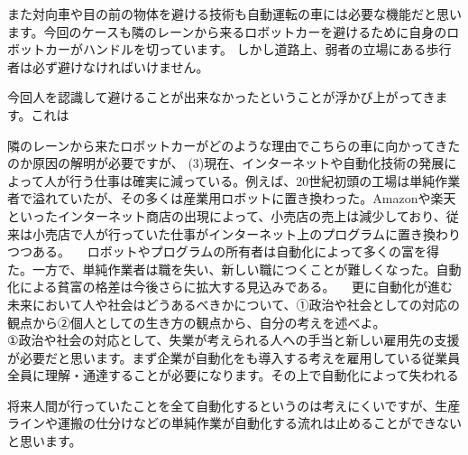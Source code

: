 \documentclass[11pt,a4paper]{jsarticle}
\begin{document}
また対向車や目の前の物体を避ける技術も自動運転の車には必要な機能だと思います。今回のケースも隣のレーンから来るロボットカーを避けるために自身のロボットカーがハンドルを切っています。
しかし道路上、弱者の立場にある歩行者は必ず避けなければいけません。

今回人を認識して避けることが出来なかったということが浮かび上がってきます。これは


隣のレーンから来たロボットカーがどのような理由でこちらの車に向かってきたのか原因の解明が必要ですが、
\newpage
 (3)現在、インターネットや自動化技術の発展によって人が行う仕事は確実に減っている。例えば、20世紀初頭の工場は単純作業者で溢れていたが、その多くは産業用ロボットに置き換わった。Amazonや楽天といったインターネット商店の出現によって、小売店の売上は減少しており、従来は小売店で人が行っていた仕事がインターネット上のプログラムに置き換わりつつある。
　ロボットやプログラムの所有者は自動化によって多くの富を得た。一方で、単純作業者は職を失い、新しい職につくことが難しくなった。自動化による貧富の格差は今後さらに拡大する見込みである。
　更に自動化が進む未来において人や社会はどうあるべきかについて、①政治や社会としての対応の観点から②個人としての生き方の観点から、自分の考えを述べよ。\\
 
①政治や社会の対応として、失業が考えられる人への手当と新しい雇用先の支援が必要だと思います。まず企業が自動化をも導入する考えを雇用している従業員全員に理解・通達することが必要になります。その上で自動化によって失われる

将来人間が行っていたことを全て自動化するというのは考えにくいですが、生産ラインや運搬の仕分けなどの単純作業が自動化する流れは止めることができないと思います。
\end{document}
